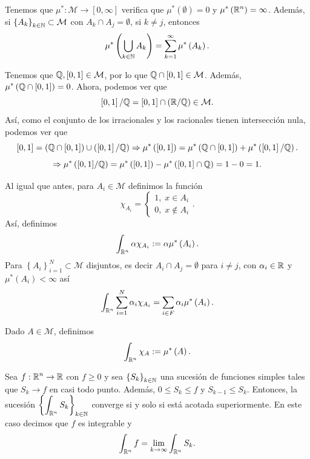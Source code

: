 \begin{observation}
	Tenemos que $\displaystyle \mu^{*}:\mathcal{M} \to [0,\infty] $ verifica que $\displaystyle \mu^{*}\left(\emptyset\right)=0 $ y $\displaystyle \mu^{*}\left(\mathbb{R}^{n}\right)=\infty $. Además, si $\displaystyle \left\{ A_{k}\right\} _{k \in \mathbb{N}}\subset \mathcal{M} $ con $\displaystyle A_{k}\cap A_{j}=\emptyset $, si $\displaystyle k \neq j $, entonces
	\[\mu^{*}\left(\bigcup_{k \in \mathbb{N}}A_{k}\right)=\sum^{\infty}_{k = 1}\mu^{*}\left(A_{k}\right) .\]
\end{observation}
\begin{eg}
	Tenemos que $\displaystyle \mathbb{Q}, \left[0,1\right] \in \mathcal{M} $, por lo que $\displaystyle \mathbb{Q} \cap \left[0,1\right] \in \mathcal{M} $. Además, $\displaystyle \mu^{*}\left(\mathbb{Q} \cap \left[0,1\right] \right)=0 $. Ahora, podemos ver que
	\[\left[0,1\right] / \mathbb{Q} = \left[0,1\right] \cap \left(\mathbb{R}/\mathbb{Q}\right)\in \mathcal{M} .\]
Así, como el conjunto de los irracionales y los racionales tienen intersección nula, podemos ver que 
\[\left[0,1\right] = \left(\mathbb{Q} \cap \left[0,1\right] \right)\cup \left(\left[0,1\right] /\mathbb{Q}\right)\Rightarrow \mu^{*}\left(\left[0,1\right] \right)=\mu^{*}\left(\mathbb{Q} \cap \left[0,1\right] \right)+\mu^{*}\left(\left[0,1\right] /\mathbb{Q}\right) .\]
\[\Rightarrow \mu^{*}\left([0,1]/\mathbb{Q}\right)=\mu^{*}\left([0,1]\right) - \mu^{*}\left([0,1]\cap \mathbb{Q}\right)=1-0=1 .\]
\end{eg}
Al igual que antes, para $\displaystyle A_{i} \in \mathcal{M} $ definimos la función
\[\chi_{A_{i}}=
\begin{cases}
1, \; x \in A_{i}\\
0, \; x \not\in A_{i}
\end{cases}
.\]
Así, definimos
\[\int _{\mathbb{R}^{n}}\alpha \chi_{A_{i}} :=\alpha\mu^{*}\left(A_{i}\right) .\]
Para $\displaystyle \left\{ A_{i}\right\} _{i=1}^{N}\subset\mathcal{M} $ disjuntos, es decir $\displaystyle A_{i}\cap A_{j}=\emptyset $ para $\displaystyle i \neq j $, con $\displaystyle \alpha_{i} \in \mathbb{R} $ y $\displaystyle \mu^{*}\left(A_{i}\right)<\infty $ así
\[\int _{\mathbb{R}^{n}}\sum^{N}_{i = 1}\alpha_{i}\chi_{A_{i}} =\sum^{}_{i \in F}\alpha_{i}\mu^{*}\left(A_{i}\right) .\]
\begin{definition}
Dado $\displaystyle A \in \mathcal{M} $, definimos
\[\int _{\mathbb{R}^{n}}\chi_{A} :=\mu^{*}\left(A\right) .\]
\end{definition}
\begin{prop}
	Sea $\displaystyle f : \mathbb{R}^{n} \to \mathbb{R} $ con $\displaystyle f \geq 0 $ y sea $\displaystyle \left\{ S_{k}\right\} _{k \in \mathbb{N}} $ una sucesión de funciones simples tales que $\displaystyle S_{k}\to f $ en casi todo punto. Además, $\displaystyle 0\leq  S_{k}\leq f $ y $\displaystyle S_{k-1}\leq S_{k} $. Entonces, la sucesión $\displaystyle \left\{ \int _{\mathbb{R}^{n}}S_{k} \right\} _{k \in \mathbb{N}} $ converge si y solo si está acotada superiormente. En este caso decimos que $\displaystyle f $ es integrable y
	\[\int _{\mathbb{R}^{n}}f = \lim_{k \to \infty} \int _{\mathbb{R}^{n}}S_{k}.\]
\end{prop}

